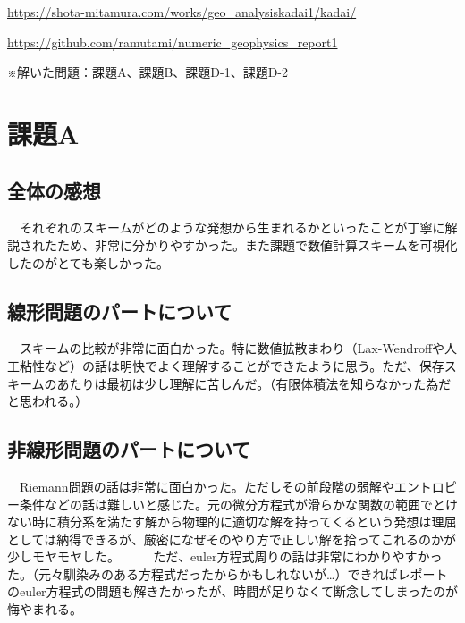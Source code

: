 \documentclass[ja=standard,xelatex]{bxjsarticle}
\newcommand{\vs}[1]{\vskip#1\baselineskip}
\begin{document}
\maketitle



\begin{description}[
  labelwidth=10.5cm,
  labelsep=0.5cm,
  leftmargin=5.8cm,
  style=nextline
]
  \item[数値計算結果の可視化動画置き場：] \href{https://shota-mitamura.com/works/geo_analysiskadai1/kadai/}{https://shota-mitamura.com/works/geo\_analysiskadai1/kadai/}
  \item[コード置き場：] \href{https://github.com/ramutami/numeric_geophysics_report1}{https://github.com/ramutami/numeric\_geophysics\_report1}
\end{description}


\vs{5}
\tableofcontents
\vs{3}
※解いた問題：課題A、課題B、課題D-1、課題D-2
\newpage

\section{課題A}
\subsection*{全体の感想}
　それぞれのスキームがどのような発想から生まれるかといったことが丁寧に解説されたため、非常に分かりやすかった。また課題で数値計算スキームを可視化したのがとても楽しかった。
\subsection*{線形問題のパートについて}
　スキームの比較が非常に面白かった。特に数値拡散まわり（Lax-Wendroffや人工粘性など）の話は明快でよく理解することができたように思う。ただ、保存スキームのあたりは最初は少し理解に苦しんだ。（有限体積法を知らなかった為だと思われる。）
\subsection*{非線形問題のパートについて}
　Riemann問題の話は非常に面白かった。ただしその前段階の弱解やエントロピー条件などの話は難しいと感じた。元の微分方程式が滑らかな関数の範囲でとけない時に積分系を満たす解から物理的に適切な解を持ってくるという発想は理屈としては納得できるが、厳密になぜそのやり方で正しい解を拾ってこれるのかが少しモヤモヤした。
　\vs{0}
　ただ、euler方程式周りの話は非常にわかりやすかった。（元々馴染みのある方程式だったからかもしれないが…）できればレポートのeuler方程式の問題も解きたかったが、時間が足りなくて断念してしまったのが悔やまれる。
\end{document}
